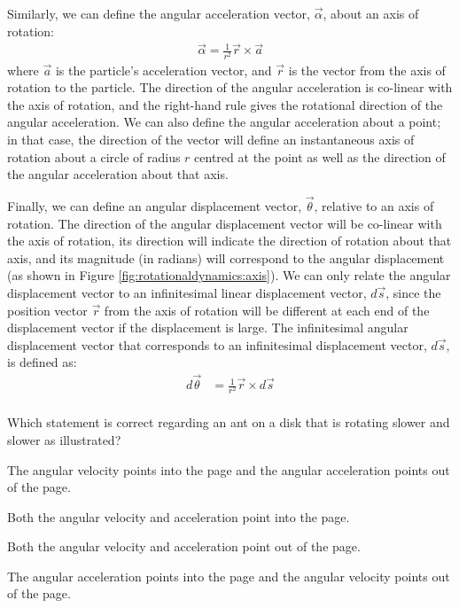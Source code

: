 Similarly, we can define the angular acceleration vector, $\vec \alpha$, about an axis of rotation:
\begin{align}
\vec \alpha = \frac{1}{r^2}\vec r \times \vec a
\end{align}
where $\vec a$ is the particle's acceleration vector,  and $\vec r$ is the vector from the axis of rotation to the particle. The direction of the angular acceleration is co-linear with the axis of rotation, and the right-hand rule gives the rotational direction of the angular acceleration. We can also define the angular acceleration about a point; in that case, the direction of the vector will define an instantaneous axis of rotation about a circle of radius $r$ centred at the point as well as the direction of the angular acceleration about that axis.

Finally, we can define an angular displacement vector, $\vec \theta$, relative to an axis of rotation. The direction of the angular displacement vector will be co-linear with the axis of rotation, its direction will indicate the direction of rotation about that axis, and its magnitude (in radians) will correspond to the angular displacement (as shown in Figure \ref{fig:rotationaldynamics:axis}). We can only relate the angular displacement vector to an infinitesimal linear displacement vector, $d\vec s$, since the position vector $\vec r$ from the axis of rotation will be different at each end of the displacement vector if the displacement is large. The infinitesimal angular displacement vector that corresponds to an infinitesimal displacement vector, $d\vec s$, is defined as:
\begin{align*}
d\vec \theta &= \frac{1}{r^2} \vec r \times d\vec s\\
\end{align*}

\begin{checkpoint}
\begin{MCquestion}{Which statement is correct regarding an ant on a disk that is rotating slower and slower as illustrated?
}
\item The angular velocity points into the page and the angular acceleration points out of the page. 
\item Both the angular velocity and acceleration point into the page.
\item Both the angular velocity and acceleration point out of the page.
\item The angular acceleration points into the page and the angular velocity points out of the page. \correct
\end{MCquestion}
\end{checkpoint}

